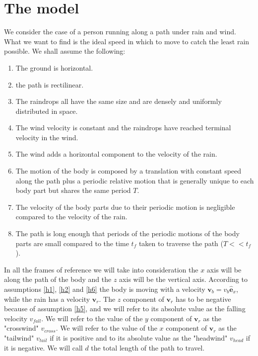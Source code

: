 \documentclass[a4paper,12pt]{article}
\begin{document}
\newpage
\section{The model}\label{model:sec}

We consider the case of a person running along a path under rain and wind. What we want to find is the ideal speed in which to move to catch the least rain possible. We shall assume the following:
\begin{enumerate}
    \item The ground is horizontal. \label{h1}
    \item the path is rectilinear. \label{h2}
    \item The raindrops all have the same size and are densely and uniformly distributed in space. \label{h3}
    \item The wind velocity is constant and the raindrops have reached terminal velocity in the wind.  \label{h4}
    \item The wind adds a horizontal component to the velocity of the rain. \label{h5}
    \item The motion of the body is composed by a translation with constant speed along the path plus a  periodic relative motion that is generally unique to each body part but shares the same period $T$. \label{h6}
    \item The velocity of the body parts due to their periodic motion is negligible compared to the velocity of the rain.  \label{h7}
    \item The path is long enough that periods of the periodic motions of the body parts are small compared to the time $t_f$ taken to traverse the path ($T << t_f$).  \label{h8}
\end{enumerate}
In all the frames of reference we will take into consideration the $x$ axis will be along the path of the body and the $z$ axis will be the vertical axis. According to assumptions \ref{h1}, \ref{h2} and \ref{h6} the body is moving with a velocity $\mathbf{v}_b = v_b\hat{\mathbf{e}}_x$, while the rain has a velocity $\mathbf{v}_r$. The $z$ component of $\mathbf{v}_r$ has to be negative because of assumption \ref{h5}, and we will refer to its absolute value as the falling velocity $v_{fall}$. We will refer to the value of the $y$ component of $\mathbf{v}_r$ as the "crosswind" $v_{cross}$. We will refer to the value of the $x$ component of $\mathbf{v}_r$ as the "tailwind" $v_{tail}$ if it is positive and to its absolute value as the "headwind" $v_{head}$ if it is negative. We will call $d$ the total length of the path to travel.
\end{document}
